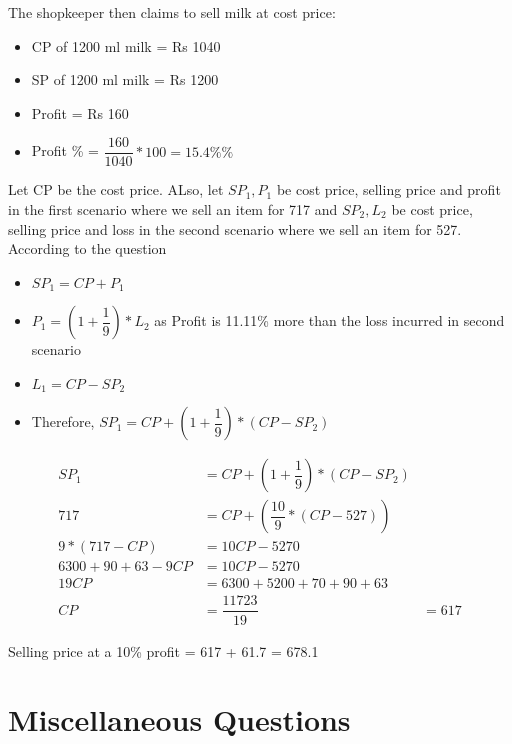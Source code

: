 The shopkeeper then claims to sell milk at cost price:
\begin{itemize}
    \item CP of 1200 ml milk = Rs 1040
    \item SP of 1200 ml milk = Rs 1200
    \item Profit = Rs 160
    \item Profit \% = $\dfrac{160}{1040} * 100 = 15.4 \% \%$
\end{itemize}


Let CP be the cost price. ALso, let $SP_1,P_1$ be cost price, selling price and profit in the first scenario where we sell an item for 717 and $SP_2,L_2$ be cost price, selling price and loss in the second scenario where we sell an item for 527. According to the question

\begin{itemize}
    \item $SP_1 = CP + P_1$
    \item $P_1 = (1 + \dfrac{1}{9} ) * L_2$ as Profit is 11.11\% more than the loss incurred in second scenario
    \item $L_1 = CP - SP_2$
    \item Therefore, $SP_1 = CP + (1 + \dfrac{1}{9}) * (CP - SP_2)$
\end{itemize}

\begin{align*}
    SP_1 &= CP + (1 + \dfrac{1}{9}) * (CP - SP_2) \\
    717 &= CP + (\dfrac{10}{9} * (CP - 527)) \\
    9 * (717 - CP) &= 10CP - 5270 \\
    6300 + 90 + 63 - 9CP &= 10CP - 5270 \\
    19CP &= 6300 + 5200 + 70 + 90 + 63 \\
    CP &= \dfrac{11723}{19}
    &= 617
\end{align*}

Selling price at a 10\% profit = 617 + 61.7 = 678.1

\section{Miscellaneous Questions}


